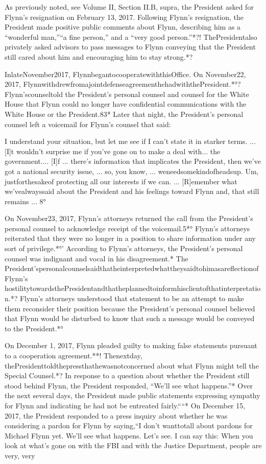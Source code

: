 As previously noted, see Volume II, Section II.B, supra, the President asked for Flynn's resignation on February 13, 2017.
Following Flynn's resignation, the President made positive public comments about Flynn, describing him as a “wonderful man,”“a fine person,” and a “very good person.”*?!
ThePresidentalso privately asked advisors to pass messages to Flynn conveying that the President still cared about him and encouraging him to stay strong.*?

InlateNovember2017, FlynnbegantocooperatewiththisOffice. On November22, 2017, FlynnwithdrewfromajointdefenseagreementhehadwiththePresident.*°?
Flynn'scounseltold the President's personal counsel and counsel for the White House that Flynn could no longer have confidential communications with the White House or the President.83*
Later that night, the President's personal counsel left a voicemail for Flynn's counsel that said:

I understand your situation, but let me see if I can't state it in starker terms. ...
[I]t wouldn't surprise me if you've gone on to make a deal with... the government....
[I]f ... there's information that implicates the President, then we've got a national security issue, ... so, you know, ... weneedsomekindofheadsup.
Um, justforthesakeof protecting all our interests if we can. ...
[R]emember what we'vealwayssaid about the President and his feelings toward Flynn and, that still remains ... 8°

On November23, 2017, Flynn's attorneys returned the call from the President's personal counsel to acknowledge receipt of the voicemail.5*°
Flynn's attorneys reiterated that they were no longer in a position to share information under any sort of privilege.*°'
According to Flynn's attorneys, the President's personal counsel was indignant and vocal in his disagreement.*
The President'spersonalcounselsaidthatheinterpretedwhattheysaidtohimasareflectionofFlynn's hostilitytowardsthePresidentandthatheplannedtoinformhisclientofthatinterpretation.*?
Flynn's attorneys understood that statement to be an attempt to make them reconsider their position because the President's personal counsel believed that Flynn would be disturbed to know that such a message would be conveyed to the President.*°

On December 1, 2017, Flynn pleaded guilty to making false statements pursuant to a cooperation agreement.**!
Thenextday, thePresidenttoldthepressthathewasnotconcerned about what Flynn might tell the Special Counsel.*?
In response to a question about whether the President still stood behind Flynn, the President responded, “We'll see what happens.”*
Over the next several days, the President made public statements expressing sympathy for Flynn and indicating he had not be entreated fairly.““*
On December 15, 2017, the President responded to a press inquiry about whether he was considering a pardon for Flynn by saying,“I don't wanttotall about pardons for Michael Flynn yet.
We'll see what happens.
Let's see.
I can say this: When you look at what's gone on with the FBI and with the Justice Department, people are very, very


